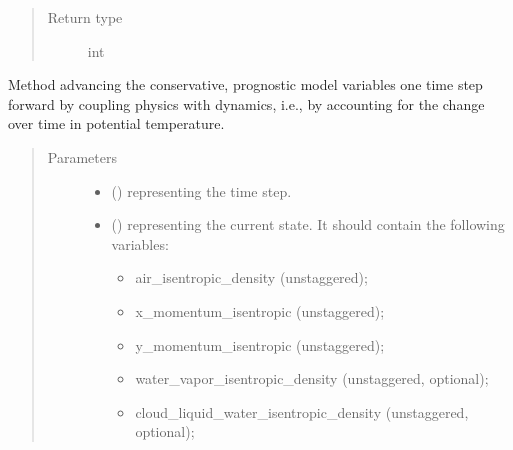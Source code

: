 \documentclass[letterpaper,10pt,english]{sphinxmanual}
\begin{document}
\begin{fulllineitems}
\begin{fulllineitems}
\begin{quote}
\begin{description}
\item[{Return type}] \leavevmode
int

\end{description}\end{quote}

\end{fulllineitems}


\begin{fulllineitems}
\label{\detokenize{api:dycore.prognostic_isentropic.PrognosticIsentropic.step_coupling_physics_with_dynamics}}
Method advancing the conservative, prognostic model variables one time step forward by coupling physics with
dynamics, i.e., by accounting for the change over time in potential temperature.
\begin{quote}\begin{description}
\item[{Parameters}] \leavevmode\begin{itemize}
\item {} 
 () \textendash{}  representing the time step.

\item {} 
 () \textendash{} 
{\hyperref[\detokenize{api:storages.state_isentropic.StateIsentropic}]{}} representing the current state.
It should contain the following variables:
\begin{itemize}
\item {} 
air\_isentropic\_density (unstaggered);

\item {} 
x\_momentum\_isentropic (unstaggered);

\item {} 
y\_momentum\_isentropic (unstaggered);

\item {} 
water\_vapor\_isentropic\_density (unstaggered, optional);

\item {} 
cloud\_liquid\_water\_isentropic\_density (unstaggered, optional);


\end{itemize}
\end{itemize}
\end{description}
\end{quote}
\end{fulllineitems}
\end{fulllineitems}
\end{document}
